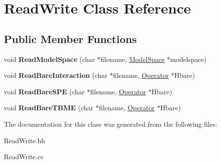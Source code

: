 \hypertarget{classReadWrite}{\section{Read\-Write Class Reference}
\label{classReadWrite}
}
\subsection*{Public Member Functions}
\begin{DoxyCompactItemize}
\item 
\hypertarget{classReadWrite_a01ee2151d7421e45ff33ca6ff9e527e6}{void {\bfseries Read\-Model\-Space} (char $\ast$filename, \hyperlink{classModelSpace}{Model\-Space} $\ast$modelspace)}\label{classReadWrite_a01ee2151d7421e45ff33ca6ff9e527e6}

\item 
\hypertarget{classReadWrite_ab13acebd1adf8e282c83fd71002da9bb}{void {\bfseries Read\-Bare\-Interaction} (char $\ast$filename, \hyperlink{classOperator}{Operator} $\ast$Hbare)}\label{classReadWrite_ab13acebd1adf8e282c83fd71002da9bb}

\item 
\hypertarget{classReadWrite_a8a1036fca4fe061ca5b659efcf3dac67}{void {\bfseries Read\-Bare\-S\-P\-E} (char $\ast$filename, \hyperlink{classOperator}{Operator} $\ast$Hbare)}\label{classReadWrite_a8a1036fca4fe061ca5b659efcf3dac67}

\item 
\hypertarget{classReadWrite_aed7ececc3e58f220c70a1b9dcd692fd1}{void {\bfseries Read\-Bare\-T\-B\-M\-E} (char $\ast$filename, \hyperlink{classOperator}{Operator} $\ast$Hbare)}\label{classReadWrite_aed7ececc3e58f220c70a1b9dcd692fd1}

\end{DoxyCompactItemize}


The documentation for this class was generated from the following files\-:\begin{DoxyCompactItemize}
\item 
Read\-Write.\-hh\item 
Read\-Write.\-cc\end{DoxyCompactItemize}
